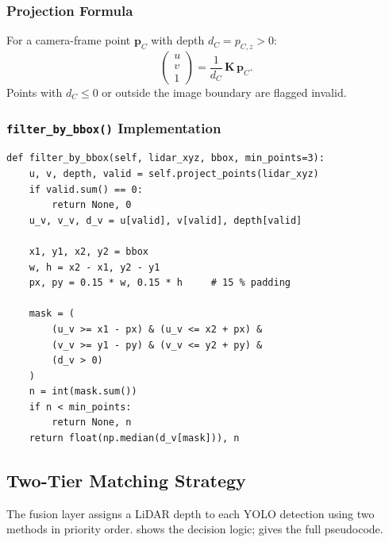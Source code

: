 \documentclass[12pt,a4paper]{article}
\begin{document}
\subsubsection{Projection Formula}

For a camera-frame point $\mathbf{p}_C$ with depth $d_C = p_{C,z} > 0$:
\begin{equation}
  \begin{pmatrix}u\\v\\1\end{pmatrix}
  = \frac{1}{d_C}\,\mathbf{K}\,\mathbf{p}_C.
  \label{eq:projection}
\end{equation}
Points with $d_C \le 0$ or outside the image boundary are flagged invalid.

\subsubsection{\texttt{filter\_by\_bbox()} Implementation}

\begin{lstlisting}[caption={\texttt{LidarCameraProjector.filter\_by\_bbox}:
  counts LiDAR points inside a YOLO bounding box and returns median depth.},
  label={lst:filter_by_bbox}]
def filter_by_bbox(self, lidar_xyz, bbox, min_points=3):
    u, v, depth, valid = self.project_points(lidar_xyz)
    if valid.sum() == 0:
        return None, 0
    u_v, v_v, d_v = u[valid], v[valid], depth[valid]

    x1, y1, x2, y2 = bbox
    w, h = x2 - x1, y2 - y1
    px, py = 0.15 * w, 0.15 * h     # 15 % padding

    mask = (
        (u_v >= x1 - px) & (u_v <= x2 + px) &
        (v_v >= y1 - py) & (v_v <= y2 + py) &
        (d_v > 0)
    )
    n = int(mask.sum())
    if n < min_points:
        return None, n
    return float(np.median(d_v[mask])), n
\end{lstlisting}

\subsection{Two-Tier Matching Strategy}
\label{subsec:two_tier}

The fusion layer assigns a LiDAR depth to each YOLO detection using two
methods in priority order.   shows the decision
logic;  gives the full pseudocode.
\end{document}
